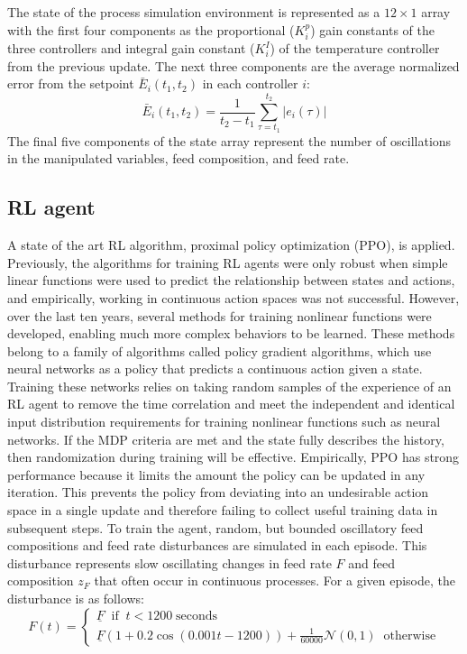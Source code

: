 The state of the process simulation environment is represented as a $12\times 1$ array with the first four components as the proportional ($K_i^p$) gain constants of the three controllers and integral gain constant ($K_i^I$) of the temperature controller from the previous update. The next three components are the average normalized error from the setpoint $\bar E_i(t_1,t_2)$ in each controller $i$:
\begin{equation}
	\bar E_i(t_1, t_2) =\frac{1}{t_2-t_1}\sum_{\tau=t_1}^{t_2} \lvert e_i(\tau) \rvert
\end{equation}
The final five components of the state array represent the number of oscillations in the manipulated variables, feed composition, and feed rate. 

\subsection{RL agent}
A state of the art RL algorithm, proximal policy optimization (PPO), is applied.\cite{Schulman2017} Previously, the algorithms for training RL agents were only robust when simple linear functions were used to predict the relationship between states and actions, and empirically, working in continuous action spaces was not successful.\cite{Sutton2018} However, over the last ten years, several methods for training nonlinear functions were developed, enabling much more complex behaviors to be learned.\cite{Mnih2013, Lillicrap2016} These methods belong to a family of algorithms called policy gradient algorithms, which use neural networks as a policy that predicts a continuous action given a state. Training these networks relies on taking random samples of the experience of an RL agent to remove the time correlation and meet the independent and identical input distribution requirements for training nonlinear functions such as neural networks. If the MDP criteria are met and the state fully describes the history, then randomization during training will be effective. Empirically, PPO has strong performance because it limits the amount the policy can be updated in any iteration. This prevents the policy from deviating into an undesirable action space in a single update and therefore failing to collect useful training data in subsequent steps.\cite{Schulman2017, Engstrom2020} To train the agent, random, but bounded oscillatory feed compositions and feed rate disturbances are simulated in each episode. This disturbance represents slow oscillating changes in feed rate $F$ and feed composition $z_F$ that often occur in continuous processes. For a given episode, the disturbance is as follows:
\begin{equation}
	F(t) = 
	\begin{cases}
		\underline F \;\; \text{if}\;\; t < 1200 \;\text{seconds} \\
		\underline F(1+ 0.2\cos(0.001t-1200))+\frac{1}{60000} \mathcal{N}(0,1) \;\; \text{otherwise}
	\end{cases}
\end{equation}

